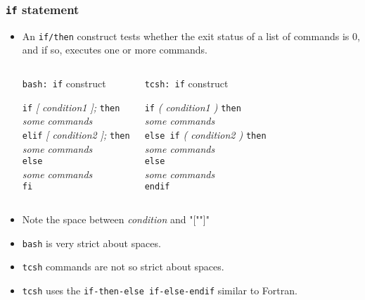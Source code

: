 \documentclass[slidestop,mathserif,compress,xcolor=svgnames]{beamer}
\newenvironment{eblock}[0]
{
\begin{beamerboxesrounded}[upper=uppercol2,lower=lowercol2,shadow=true]}
{\end{beamerboxesrounded}}
\begin{document}
\begin{frame}
  \frametitle{\small \texttt{if} statement}
  \begin{itemize}
    \item An \texttt{if/then} construct tests whether the exit status of a list of commands is 0, and if so, executes one or more commands.
    \begin{columns}
      \column{5cm}
      \begin{eblock}{\texttt{bash: if} construct}
        \begin{tabbing}
          \texttt{if} \=\textit{[ condition1 ]; } \texttt{then}\\
          \> \textit{some commands}\\
          \texttt{elif} \textit{ [ condition2 ]; } \texttt{then}\\
          \> \textit{some commands}\\
          \texttt{else}\\
          \> \textit{some commands}\\
          \texttt{fi}
        \end{tabbing}
      \end{eblock}
      \column{5cm}
      \begin{eblock}{\texttt{tcsh: if} construct}
        \begin{tabbing}
          \texttt{if} \=\textit{( condition1 ) } \texttt{then}\\
          \> \textit{some commands}\\
          \texttt{else if} \textit{ ( condition2 ) } \texttt{then}\\
          \> \textit{some commands}\\
          \texttt{else}\\
          \> \textit{some commands}\\
          \texttt{endif}
        \end{tabbing}
      \end{eblock}
    \end{columns}
  \item Note the space between \textit{condition} and "["\quad"]"
  \item \texttt{bash} is very strict about spaces.
  \item \texttt{tcsh} commands are not so strict about spaces.
  \item \texttt{tcsh} uses the \texttt{if-then-else if-else-endif} similar to Fortran.   
  \end{itemize}
\end{frame}
\end{document}

